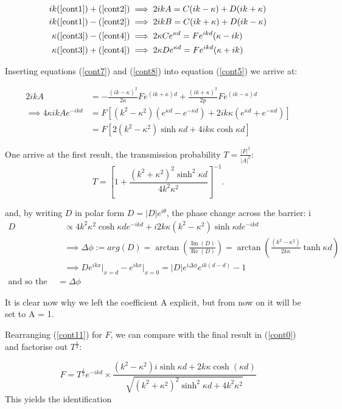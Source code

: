 \documentclass{article}
\begin{document}
\begin{align}
	ik(\ref{cont1})+(\ref{cont2}) &\implies 2ikA = C(ik-\kappa)+D(ik+\kappa) \\
	ik(\ref{cont1})-(\ref{cont2}) &\implies 2ikB = C(ik+\kappa)+D(ik-\kappa) \\
	\kappa(\ref{cont3})-(\ref{cont4}) &\implies 2\kappa Ce^{\kappa d} = Fe^{ikd}(\kappa-ik)\\
	\kappa(\ref{cont3})+(\ref{cont4}) &\implies 2\kappa De^{\kappa d} = Fe^{ikd}(\kappa+ik) 
\end{align}

Inserting equations (\ref{cont7}) and (\ref{cont8}) into equation (\ref{cont5}) we arrive at:

\begin{align}
	2ikA &= -\frac{(ik-\kappa)^2}{2\kappa}Fe^{(ik+\kappa)d}+\frac{(ik+\kappa)^2}{2p}Fe^{(ik-\kappa)d} \\
	\implies 4\kappa ikAe^{-ikd} &= F[(k^2-\kappa^2)(e^{\kappa d}-e^{-\kappa d})+2ik\kappa(e^{\kappa d}+e^{-\kappa d})] \\
				     &= F[2(k^2-\kappa^2)\sinh{\kappa d}+4ik\kappa \cosh{\kappa d}] 
\end{align}

One arrive at the first result, the transmission probability $T = \frac{|F|^2}{|A|^2}$:
\[
	T = [1+\frac{(k^2+\kappa^2)^2\sinh^2{\kappa d}}{4k^2\kappa^2}]^{-1}
.\] 

and, by writing $D$ in polar form $D = |D|e^{i\theta}$, the phase change across the barrier:
i
\begin{align}
	D &\propto 4k^2\kappa^2 \cosh{\kappa d}e^{-ikd}+i2k\kappa(k^2-\kappa^2)\sinh{\kappa d}e^{-ikd} \\
	  &\implies \Delta \phi := arg(D) = \arctan\left(\frac{\operatorname{Im}(D)}{\operatorname{Re}(D)}\right) = \arctan\left(\frac{(k^2-\kappa^2)}{2k\kappa}\tanh{\kappa d}\right) \\
	  &\implies De^{ikx}\rvert_{x=d}-e^{ikx}\rvert_{x=0} = |D|e^{i\Delta \phi}e^{ik(d-d)}-1 \\
	  \text{and so the phase change} = \Delta \phi
\end{align}

It is clear now why we left the coefficient A explicit, but from now on it will be set to A = 1.

Rearranging (\ref{cont11}) for $F$, we can compare with the final result in (\ref{cont0}) and factorise out $T^\frac{1}{2}$:

\[
	F = T^{\frac{1}{2}}e^{-ikd} \times \frac{(k^2-\kappa^2)i\sinh{\kappa d}+2k\kappa \cosh(\kappa d)}{\sqrt{(k^2+\kappa^2)^2\sinh^{2}{\kappa d}+4k^2\kappa^2}}
\] 
This yields the identification
\end{document}
